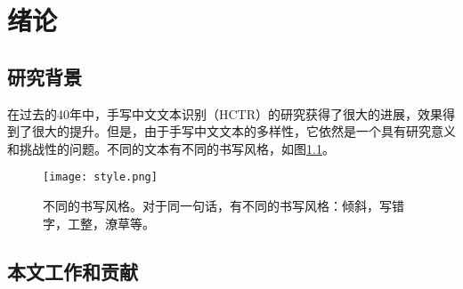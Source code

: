 \documentclass[winfonts]{njuthesis}
\begin{document}
%
%
%
%

\tableofcontents



\mainmatter

\chapter{绪论}\label{chapter_introduction}
\section{研究背景}
在过去的40年中，手写中文文本识别（HCTR）的研究获得了很大的进展，效果得到了很大的提升\cite{fujisawa2008forty}。但是，由于手写中文文本的多样性，它依然是一个具有研究意义和挑战性的问题\cite{xu2012touching}。不同的文本有不同的书写风格，如图\ref{fig:style}。 

\begin{figure}[htbp]
   \centering
   \texttt{[image: style.png]} %
   \caption{不同的书写风格。对于同一句话，有不同的书写风格：倾斜，写错字，工整，潦草等。}
   \label{fig:style}
\end{figure}

\section{本文工作和贡献}
\end{document}
